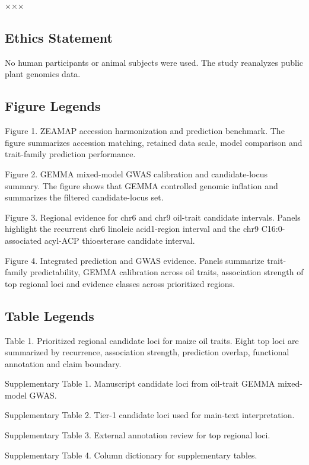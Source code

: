 \documentclass[
]{article}
\begin{document}
×××

\subsection{Ethics Statement}\label{ethics-statement}

No human participants or animal subjects were used. The study reanalyzes
public plant genomics data.

\subsection{Figure Legends}\label{figure-legends}

Figure 1. ZEAMAP accession harmonization and prediction benchmark. The
figure summarizes accession matching, retained data scale, model
comparison and trait-family prediction performance.

Figure 2. GEMMA mixed-model GWAS calibration and candidate-locus
summary. The figure shows that GEMMA controlled genomic inflation and
summarizes the filtered candidate-locus set.

Figure 3. Regional evidence for chr6 and chr9 oil-trait candidate
intervals. Panels highlight the recurrent chr6 linoleic acid1-region
interval and the chr9 C16:0-associated acyl-ACP thioesterase candidate
interval.

Figure 4. Integrated prediction and GWAS evidence. Panels summarize
trait-family predictability, GEMMA calibration across oil traits,
association strength of top regional loci and evidence classes across
prioritized regions.

\subsection{Table Legends}\label{table-legends}

Table 1. Prioritized regional candidate loci for maize oil traits. Eight
top loci are summarized by recurrence, association strength, prediction
overlap, functional annotation and claim boundary.

Supplementary Table 1. Manuscript candidate loci from oil-trait GEMMA
mixed-model GWAS.

Supplementary Table 2. Tier-1 candidate loci used for main-text
interpretation.

Supplementary Table 3. External annotation review for top regional loci.

Supplementary Table 4. Column dictionary for supplementary tables.
\end{document}
